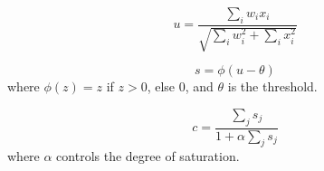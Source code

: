 
\begin{equation}
u = \frac{\sum_{i} w_i x_i}{\sqrt{\sum_{i} w_i^2 + \sum_{i} x_i^2}}
\end{equation}

\begin{equation}
s = \phi(u - \theta)
\end{equation}
where \( \phi(z) = z \) if \( z > 0 \), else \( 0 \), and \( \theta \) is the threshold.

\begin{equation}
c = \frac{\sum_{j} s_j}{1 + \alpha \sum_{j} s_j}
\end{equation}
where \( \alpha \) controls the degree of saturation.
